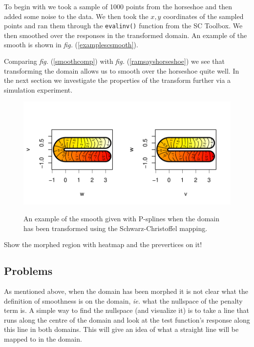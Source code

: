 \documentclass[a4paper,10pt]{amsart}
\newcommand{\sch}{Schwarz-Christoffel }
\newcommand{\fig}[1]{\emph{fig.} (\ref{#1})}
\begin{document}
To begin with we took a sample of 1000 points from the horseshoe and then added some noise to the data. We then took the $x,y$ coordinates of the sampled points and ran them through the \texttt{evalinv()} function from the SC Toolbox. We then smoothed over the responses in the transformed domain. An example of the smooth is shown in \fig{examplescsmooth}.

Comparing \fig{smoothcomp} with \fig{ramsayshorseshoe} we see that transforming the domain allows us to smooth over the horseshoe quite well. In the next section we investigate the properties of the transform further via a simulation experiment.



\begin{figure}
\centering
\includegraphics[trim=0in 0in 0in 0in]{figs/compsmooth.pdf} \\
\caption{An example of the smooth given with P-splines when the domain has been transformed using the \sch mapping.}
\label{compsmooth}
\end{figure}




Show the morphed region with heatmap and the prevertices on it!



\subsection{Problems}

As mentioned above, when the domain has been morphed it is not clear what the definition of smoothness is on the domain, \emph{ie.} what the nullspace of the penalty term is. A simple way to find the nullspace (and visualize it) is to take a line that runs along the centre of the domain and look at the test function's response along this line in both domains. This will give an idea of what a straight line will be mapped to in the domain.
\end{document}

